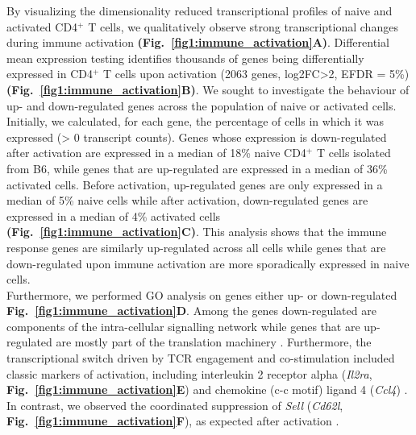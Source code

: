 By visualizing the dimensionality reduced transcriptional profiles of naive and activated CD4$^+$ T cells, we qualitatively observe strong transcriptional changes during immune activation \textbf{(Fig.~\ref{fig1:immune_activation}A)}. Differential mean expression testing identifies thousands of genes being differentially expressed in CD4$^+$ T cells upon activation (2063 genes, log2FC>2, EFDR = 5\%) \textbf{(Fig.~\ref{fig1:immune_activation}B)}. We sought to investigate the behaviour of up- and down-regulated genes across the population of naive or activated cells. Initially, we calculated, for each gene, the percentage of cells in which it was expressed (> 0 transcript counts). Genes whose expression is down-regulated after activation are expressed in a median of 18\% naive CD4$^+$ T cells isolated from B6, while genes that are up-regulated are expressed in a median of 36\% activated cells. Before activation, up-regulated genes are only expressed in a median of 5\% naive cells while after activation, down-regulated genes are expressed in a median of 4\% activated cells \textbf{(Fig.~\ref{fig1:immune_activation}C)}. This analysis shows that the immune response genes are similarly up-regulated across all cells while genes that are down-regulated upon immune activation are more sporadically expressed in naive cells. \\

Furthermore, we performed GO analysis on genes either up- or down-regulated \textbf{Fig.~\ref{fig1:immune_activation}D}. Among the genes down-regulated are components of the intra-cellular signalling network while genes that are up-regulated are mostly part of the translation machinery \citep{Bjur2013}. Furthermore, the transcriptional switch driven by TCR engagement and co-stimulation included classic markers of activation, including interleukin 2 receptor alpha (\textit{Il2ra}, \textbf{Fig.~\ref{fig1:immune_activation}E}) and chemokine (c-c motif) ligand 4 (\textit{Ccl4}) \citep{Asmal2003}. In contrast, we observed the coordinated suppression of \textit{Sell} (\textit{Cd62l}, \textbf{Fig.~\ref{fig1:immune_activation}F}), as expected after activation \citep{Park2005}.

\newpage

